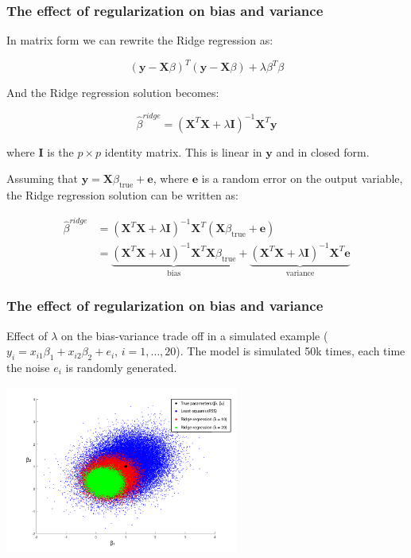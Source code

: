 \documentclass[notes]{beamer}          %
\begin{document}
\begin{frame}
\frametitle{The effect of regularization on bias and variance}
In matrix form we can rewrite the Ridge regression as:

\begin{equation*}
    (\mathbf{y} - \mathbf{X}\beta)^T (\mathbf{y} - \mathbf{X}\beta) + \lambda\beta^T\beta
\end{equation*}

And the Ridge regression solution becomes:

\begin{equation*}
    \hat{\beta}^{ridge} = (\mathbf{X}^T \mathbf{X} + \lambda \mathbf{I})^{-1}\mathbf{X}^T\mathbf{y} 
\end{equation*}

where $\mathbf{I}$ is the $p \times p$ identity matrix. This is linear in $\mathbf{y}$ and in closed form.

Assuming that $\mathbf{y} = \mathbf{X}\beta_{\mathrm{true}} + \mathbf{e}$, where $\mathbf{e}$ is a random error on the output variable, the Ridge regression solution can be written as:

\begin{align*}
    \hat{\beta}^{ridge} &= (\mathbf{X}^T \mathbf{X} + \lambda \mathbf{I})^{-1}\mathbf{X}^T(\mathbf{X}\beta_{\mathrm{true}} + \mathbf{e}) \\
    &= \underbrace{(\mathbf{X}^T \mathbf{X} + \lambda \mathbf{I})^{-1}\mathbf{X}^T\mathbf{X}\beta_{\mathrm{true}}}_{\textrm{bias}} + \underbrace{(\mathbf{X}^T \mathbf{X} + \lambda \mathbf{I})^{-1}\mathbf{X}^T\mathbf{e}}_{\textrm{variance}}
\end{align*}

\end{frame}


\begin{frame}
\frametitle{The effect of regularization on bias and variance}
Effect of $\lambda$ on the bias-variance trade off in a simulated example ($y_i = x_{i1}\beta_1 + x_{i2}\beta_2 + e_i$, $i=1,\dots, 20$). The model is simulated 50k times, each time the noise $e_i$ is randomly generated.




\begin{center}
\includegraphics[height=5.5cm]{../figures/week_2_linear_models/Ridge_bias_variance_insilico.pdf}
\end{center}

\end{frame}
\end{document}
